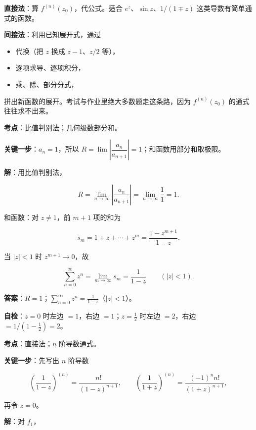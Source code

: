 \documentclass[11pt]{ctexart}
\renewcommand{\qbreak}{\needspace{0.45\textheight}}
\let\origsubhdr\subhdr
\renewcommand{\subhdr}[1]{\par\needspace{4\baselineskip}\origsubhdr{#1}}
\begin{document}

\textbf{直接法}：算 $f^{(n)}(z_0)$，代公式。适合 $e^z$、$\sin z$、$1/(1\mp z)$ 这类导数有简单通式的函数。

\textbf{间接法}：利用已知展开式，通过

\begin{itemize}
\item 代换（把 $z$ 换成 $z-1$、$z/2$ 等），
\item 逐项求导、逐项积分，
\item 乘、除、部分分式，
\end{itemize}

拼出新函数的展开。考试与作业里绝大多数题走这条路，因为 $f^{(n)}(z_0)$ 的通式往往求不出来。

\qbreak
{}

\textbf{考点}：比值判别法；几何级数部分和。

\textbf{关键一步}：$a_n=1$，所以 $R=\lim\left|\dfrac{a_n}{a_{n+1}}\right|=1$；和函数用部分和取极限。

\textbf{解}：用比值判别法，

\[ R=\lim_{n\to\infty}\left|\frac{a_n}{a_{n+1}}\right|=\lim_{n\to\infty}\frac{1}{1}=1 . \]

和函数：对 $z\ne1$，前 $m+1$ 项的和为

\[ s_m=1+z+\cdots+z^m=\frac{1-z^{m+1}}{1-z} . \]

当 $|z|<1$ 时 $z^{m+1}\to0$，故

\[ \sum_{n=0}^{\infty}z^n=\lim_{m\to\infty}s_m=\frac{1}{1-z}\qquad(|z|<1) . \]

\textbf{答案}：$R=1$；$\displaystyle\sum_{n=0}^{\infty}z^n=\frac{1}{1-z}$（$|z|<1$）。

\textbf{自检}：$z=0$ 时左边 $=1$，右边 $=1$；$z=\tfrac12$ 时左边 $=2$，右边 $=1/(1-\tfrac12)=2$。

\qbreak
{}

\textbf{考点}：直接法；$n$ 阶导数通式。

\textbf{关键一步}：先写出 $n$ 阶导数

\[ \left(\frac{1}{1-z}\right)^{(n)}=\frac{n!}{(1-z)^{n+1}},\qquad \left(\frac{1}{1+z}\right)^{(n)}=\frac{(-1)^n n!}{(1+z)^{n+1}} , \]

再令 $z=0$。

\textbf{解}：对 $f_1$，
\end{document}
